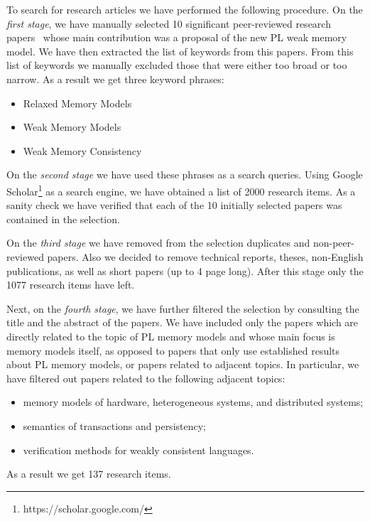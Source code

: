 To search for research articles we have performed the following procedure.
On the \emph{first stage}, we have manually selected 10 significant 
peer-reviewed research papers~\cite{
Manson-al:POPL05,
Batty-al:POPL11,
Lahav-al:PLDI17,
Dolan-al:PLDI18,
Watt-al:PLDI2020,
Jeffrey-Riely:LICS16,
PichonPharabod-Sewell:POPL16,
Kang-al:POPL17,
Chakraborty-Vafeiadis:POPL19,
Paviotti-al:ESOP20
} 
whose main contribution was a proposal of the new PL weak memory model.
We have then extracted the list of keywords from this papers. 
From this list of keywords we manually excluded those 
that were either too broad or too narrow.
As a result we get three keyword phrases:
\begin{itemize}
  \item Relaxed Memory Models
  \item Weak Memory Models
  \item Weak Memory Consistency
\end{itemize}
 
On the \emph{second stage} we have used these phrases as a search queries. 
Using Google Scholar\footnote{https://scholar.google.com/} as a search engine, we have obtained a list of 2000 research items. 
As a sanity check we have verified that each of the 10 initially selected papers was contained in the selection. 

On the \emph{third stage} we have removed from the selection duplicates and non-peer-reviewed papers. 
Also we decided to remove technical reports, theses, 
non-English publications, as well as short papers (up to 4 page long).
After this stage only the 1077 research items have left.

Next, on the \emph{fourth stage}, we have further filtered the selection 
by consulting the title and the abstract of the papers. 
We have included only the papers which are directly related to the 
topic of PL memory models and whose main focus is memory models itself,
as opposed to papers that only use established results about PL memory models,
or papers related to adjacent topics. 
In particular, we have filtered out papers related to the following adjacent topics:
\begin{itemize}
  \item memory models of hardware, heterogeneous systems, and distributed systems;
  \item semantics of transactions and persistency;
  \item verification methods for weakly consistent languages.
\end{itemize}
As a result we get 137 research items.

